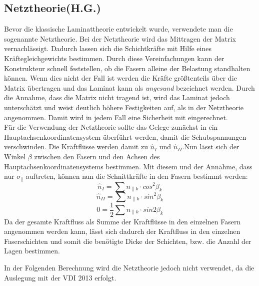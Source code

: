 \subsection{Netztheorie(H.G.)}
Bevor die klassische Laminattheorie entwickelt wurde, verwendete man die sogenannte Netztheorie. 
Bei der Netztheorie wird das Mittragen der Matrix vernachlässigt. Dadurch lassen sich die Schichtkräfte mit Hilfe eines Kräftegleichgewichts bestimmen. 
Durch diese Vereinfachungen kann der Konstrukteur schnell feststellen, ob die Fasern alleine der Belastung standhalten können. Wenn dies nicht der Fall ist werden die Kräfte größtenteils über die Matrix übertragen und das Laminat kann als \textit{ungesund} bezeichnet werden. Durch die Annahme, dass die Matrix nicht tragend ist, wird das Laminat jedoch unterschätzt und weist deutlich höhere Festigkeiten auf, als in der Netztheorie angenommen. Damit wird in jedem Fall eine Sicherheit mit eingerechnet.\\
Für die Verwendung der Netztheorie sollte das Gelege zunächst in ein Hauptachsenkoordinatensystem überführt werden, damit die Schubspannungen verschwinden. Die Kraftflüsse werden damit zu $\hat{n}_{I}$ und $\hat{n}_{II}$.Nun lässt sich der Winkel $\beta $ zwischen den Fasern und den Achsen des Hauptachsenkoordinatensystems bestimmen. Mit diesem und der Annahme, dass nur $\sigma_{\|}$ auftreten, können nun die Schnittkräfte in den Fasern bestimmt werden:
\begin{equation}
\hat{n}_{I}=\sum n_{\|k}\cdot cos^2\beta_{k}
\end{equation}
\begin{equation}
\hat{n}_{II}=\sum n_{\|k}\cdot sin^2\beta_{k}
\end{equation}
\begin{equation}
0=\frac{1}{2}\sum n_{\|k}\cdot sin2\beta_{k}
\end{equation}
Da der gesamte Kraftfluss als Summe der Kraftflüsse in den einzelnen Fasern angenommen werden kann, lässt sich dadurch der Kraftfluss in den einzelnen Faserschichten und somit die benötigte Dicke der Schichten, bzw. die Anzahl der Lagen bestimmen.\cite{item3}

In der Folgenden Berechnung wird die Netztheorie jedoch nicht verwendet, da die Auslegung mit der VDI 2013 erfolgt.
